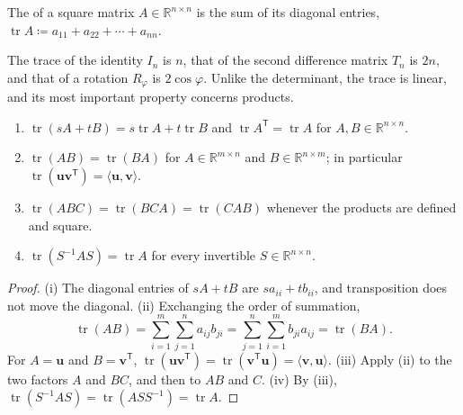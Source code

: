 \begin{definition}[Trace]
\label{def:trace}
The  of a square matrix $A\in\mathbb R^{n\times n}$ is the sum of its diagonal entries, $\operatorname{tr}A\coloneqq a_{11}+a_{22}+\cdots+a_{nn}$.
\end{definition}

The trace of the identity $I_n$ is $n$, that of the second difference matrix $T_n$ is $2n$, and that of a rotation $R_\varphi$ is $2\cos\varphi$. Unlike the determinant, the trace is linear, and its most important property concerns products.

\begin{proposition}
\label{prop:trace}
\begin{enumerate}
\item $\operatorname{tr}(sA+tB)=s\operatorname{tr}A+t\operatorname{tr}B$ and $\operatorname{tr}A^{\mathsf T}=\operatorname{tr}A$ for $A,B\in\mathbb R^{n\times n}$.
\item $\operatorname{tr}(AB)=\operatorname{tr}(BA)$ for $A\in\mathbb R^{m\times n}$ and $B\in\mathbb R^{n\times m}$; in particular $\operatorname{tr}(\mathbf u\mathbf v^{\mathsf T})=\langle\mathbf u,\mathbf v\rangle$.
\item $\operatorname{tr}(ABC)=\operatorname{tr}(BCA)=\operatorname{tr}(CAB)$ whenever the products are defined and square.
\item $\operatorname{tr}(S^{-1}AS)=\operatorname{tr}A$ for every invertible $S\in\mathbb R^{n\times n}$.
\end{enumerate}
\end{proposition}

\begin{proof}
(i) The diagonal entries of $sA+tB$ are $sa_{ii}+tb_{ii}$, and transposition does not move the diagonal. (ii) Exchanging the order of summation,
\[
\operatorname{tr}(AB)=\sum_{i=1}^m\sum_{j=1}^na_{ij}b_{ji}=\sum_{j=1}^n\sum_{i=1}^mb_{ji}a_{ij}=\operatorname{tr}(BA).
\]
For $A=\mathbf u$ and $B=\mathbf v^{\mathsf T}$, $\operatorname{tr}(\mathbf u\mathbf v^{\mathsf T})=\operatorname{tr}(\mathbf v^{\mathsf T}\mathbf u)=\langle\mathbf v,\mathbf u\rangle$. (iii) Apply (ii) to the two factors $A$ and $BC$, and then to $AB$ and $C$. (iv) By (iii), $\operatorname{tr}(S^{-1}AS)=\operatorname{tr}(ASS^{-1})=\operatorname{tr}A$.
\end{proof}


